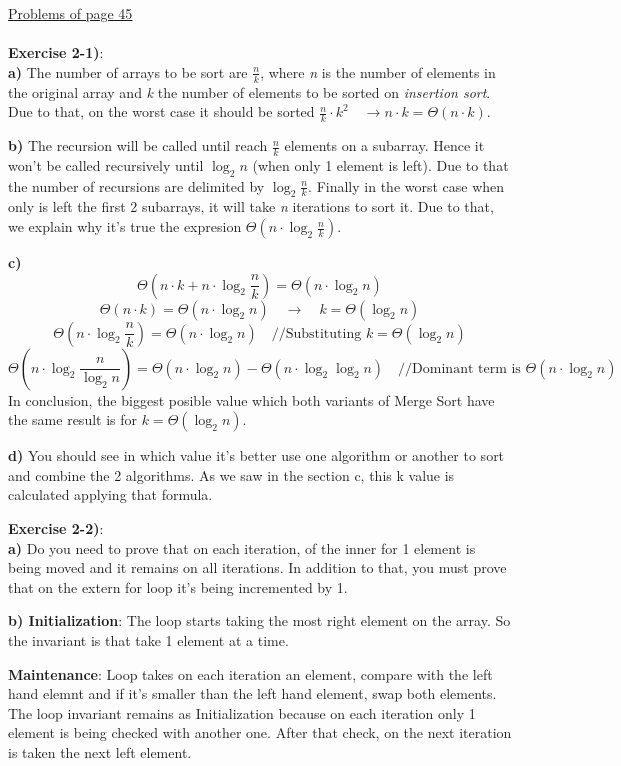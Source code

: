 \documentclass{article}
\newcounter{exercise}[section]   %
\begin{document}
\underline{\large{Problems of page 45}}\\
\\
\textbf{Exercise 2-1)}:\\
\textbf{a)} The number of arrays to be sort are \(\frac{n}{k}\), where \textit{n} is the
number of elements in the original array and \textit{k} the number of elements to be sorted on
\textit{insertion sort}. Due to that, on the worst case it should be sorted \(\frac{n}{k}
\cdot k^2 \quad \rightarrow n \cdot k = \Theta(n \cdot k)\).

\textbf{b)} The recursion will be called until reach \(\frac{n}{k}\) elements on a subarray.
Hence it won't be called recursively until \(\log_2 n\) (when only 1 element is left). 
Due to that the number of recursions are delimited by \(\log_2 \frac{n}{k}\). Finally in the
worst case when only is left the first 2 subarrays, it will take \textit{n} iterations to
sort it. Due to that, we explain why it's true the expresion \(\Theta(n \cdot \log_2 \frac{n}{k})\).

\textbf{c)}  
\[
\Theta\left(n \cdot k + n \cdot \log_2 \frac{n}{k}\right) = \Theta(n \cdot \log_2 n)
\]
\[
\Theta(n \cdot k) = \Theta(n \cdot \log_2 n) \quad \rightarrow \quad k = \Theta(\log_2 n)
\]
\[
\Theta\left(n \cdot \log_2 \frac{n}{k}\right) = \Theta(n \cdot \log_2 n) \quad 
\text{//Substituting } k = \Theta(\log_2 n)
\]
\[
\Theta\left(n \cdot \log_2 \frac{n}{\log_2 n}\right) = \Theta(n \cdot \log_2 n) - \Theta(n \cdot \log_2 \log_2 n)
\quad \text{//Dominant term is  \(\Theta(n \cdot \log_2 n)\)}
\]
In conclusion, the biggest posible value which both variants of Merge Sort have the same result
is for \(k = \Theta(\log_2 n)\).

\textbf{d)}
You should see in which value it's better use one algorithm or another to sort and combine
the 2 algorithms. As we saw in the section c, this k value is calculated applying that formula.

\textbf{Exercise 2-2)}:\\
\textbf{a)} Do you need to prove that on each iteration, of the inner for 1 element is being
moved and it remains on all iterations. In addition to that, you must prove that on the extern
for loop it's being incremented by 1.

\textbf{b) Initialization}: The loop starts taking the most right element on the array.
So the invariant is that take 1 element at a time.

\textbf{Maintenance}: Loop takes on each iteration an element, compare with the left hand
elemnt and if it's smaller than the left hand element, swap both elements. The loop invariant
remains as Initialization because on each iteration only 1 element is being checked with
another one. After that check, on the next iteration is taken the next left element.
\end{document}
